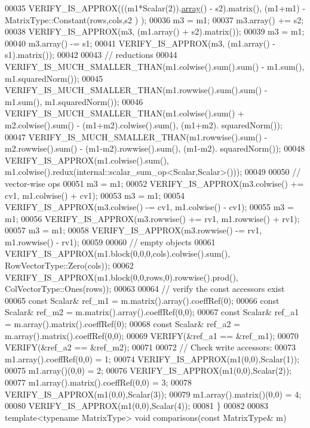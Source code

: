 \begin{DoxyCode}
00035   VERIFY\_IS\_APPROX(((m1*Scalar(2)).\hyperlink{class_eigen_1_1array}{array}() - s2).matrix(), (m1+m1) - MatrixType::Constant(rows,cols,s2
      ) );
00036   m3 = m1;
00037   m3.array() += s2;
00038   VERIFY\_IS\_APPROX(m3, (m1.array() + s2).matrix());
00039   m3 = m1;
00040   m3.array() -= s1;
00041   VERIFY\_IS\_APPROX(m3, (m1.array() - s1).matrix());
00042 
00043   \textcolor{comment}{// reductions}
00044   VERIFY\_IS\_MUCH\_SMALLER\_THAN(m1.colwise().sum().sum() - m1.sum(), m1.squaredNorm());
00045   VERIFY\_IS\_MUCH\_SMALLER\_THAN(m1.rowwise().sum().sum() - m1.sum(), m1.squaredNorm());
00046   VERIFY\_IS\_MUCH\_SMALLER\_THAN(m1.colwise().sum() + m2.colwise().sum() - (m1+m2).colwise().sum(), (m1+m2).
      squaredNorm());
00047   VERIFY\_IS\_MUCH\_SMALLER\_THAN(m1.rowwise().sum() - m2.rowwise().sum() - (m1-m2).rowwise().sum(), (m1-m2).
      squaredNorm());
00048   VERIFY\_IS\_APPROX(m1.colwise().sum(), m1.colwise().redux(internal::scalar\_sum\_op<Scalar,Scalar>()));
00049 
00050   \textcolor{comment}{// vector-wise ops}
00051   m3 = m1;
00052   VERIFY\_IS\_APPROX(m3.colwise() += cv1, m1.colwise() + cv1);
00053   m3 = m1;
00054   VERIFY\_IS\_APPROX(m3.colwise() -= cv1, m1.colwise() - cv1);
00055   m3 = m1;
00056   VERIFY\_IS\_APPROX(m3.rowwise() += rv1, m1.rowwise() + rv1);
00057   m3 = m1;
00058   VERIFY\_IS\_APPROX(m3.rowwise() -= rv1, m1.rowwise() - rv1);
00059   
00060   \textcolor{comment}{// empty objects}
00061   VERIFY\_IS\_APPROX(m1.block(0,0,0,cols).colwise().sum(),  RowVectorType::Zero(cols));
00062   VERIFY\_IS\_APPROX(m1.block(0,0,rows,0).rowwise().prod(), ColVectorType::Ones(rows));
00063   
00064   \textcolor{comment}{// verify the const accessors exist}
00065   \textcolor{keyword}{const} Scalar& ref\_m1 = m.matrix().array().coeffRef(0);
00066   \textcolor{keyword}{const} Scalar& ref\_m2 = m.matrix().array().coeffRef(0,0);
00067   \textcolor{keyword}{const} Scalar& ref\_a1 = m.array().matrix().coeffRef(0);
00068   \textcolor{keyword}{const} Scalar& ref\_a2 = m.array().matrix().coeffRef(0,0);
00069   VERIFY(&ref\_a1 == &ref\_m1);
00070   VERIFY(&ref\_a2 == &ref\_m2);
00071 
00072   \textcolor{comment}{// Check write accessors:}
00073   m1.array().coeffRef(0,0) = 1;
00074   VERIFY\_IS\_APPROX(m1(0,0),Scalar(1));
00075   m1.array()(0,0) = 2;
00076   VERIFY\_IS\_APPROX(m1(0,0),Scalar(2));
00077   m1.array().matrix().coeffRef(0,0) = 3;
00078   VERIFY\_IS\_APPROX(m1(0,0),Scalar(3));
00079   m1.array().matrix()(0,0) = 4;
00080   VERIFY\_IS\_APPROX(m1(0,0),Scalar(4));
00081 \}
00082 
00083 \textcolor{keyword}{template}<\textcolor{keyword}{typename} MatrixType> \textcolor{keywordtype}{void} comparisons(\textcolor{keyword}{const} MatrixType& m)

\end{DoxyCode}
